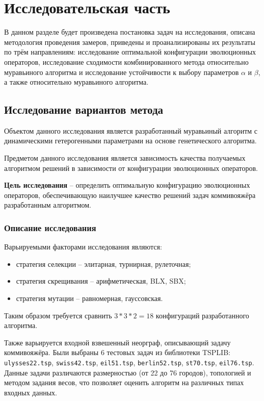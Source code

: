 \chapter{Исследовательская часть}

В данном разделе будет произведена постановка задач на исследования, описана методология проведения замеров, приведены и проанализированы их результаты по трём направлениям: исследование оптимальной конфигурации эволюционных операторов, исследование сходимости комбинированного метода относительно муравьиного алгоритма и исследование  устойчивости к выбору параметров $\alpha$ и $\beta$, а также относительно муравьиного алгоритма.

\section{Исследование вариантов метода}

Объектом данного исследования является разработанный муравьиный алгоритм с динамическими гетерогенными параметрами на основе генетического алгоритма.

Предметом данного исследования является зависимость качества получаемых алгоритмом решений в зависимости от конфигурации эволюционных операторов.

\textbf{Цель исследования} -- определить оптимальную конфигурацию эволюционных операторов, обеспечивающую наилучшее качество решений задач коммивояжёра разработанным алгоритмом.

\subsection{Описание исследования}

Варьируемыми факторами исследования являются:
\begin{itemize}
	\item стратегия селекции -- элитарная, турнирная, рулеточная;
 	\item стратегия скрещивания -- арифметическая, BLX, SBX;
	\item стратегия мутации -- равномерная, гауссовская.
\end{itemize}

Таким образом требуется сравнить $3 * 3 * 2 = 18$ конфигураций разработанного алгоритма.

Также варьируется входной взвешенный неорграф, описывающий задачу коммивояжёра. Были выбраны 6 тестовых задач из библиотеки TSPLIB: \texttt{ulysses22.tsp}, \texttt{swiss42.tsp}, \texttt{eil51.tsp}, \texttt{berlin52.tsp}, \texttt{st70.tsp}, \texttt{eil76.tsp}. Данные задачи различаются размерностью (от 22 до 76 городов), топологией и методом задания весов, что позволяет оценить алгоритм на различных типах входных данных.

